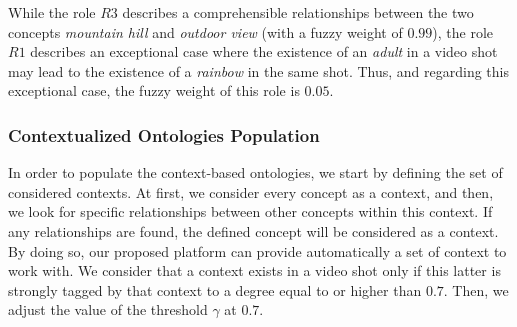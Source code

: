 		
		While the role $R3$ describes a comprehensible relationships
		between the two concepts \emph{mountain hill} and \emph{outdoor view} (with a fuzzy weight of $0.99$), the role $R1$ 
		describes an exceptional case where the existence of an \emph{adult} in a video shot may 
		lead to the existence of a
		\emph{rainbow} in the same shot. Thus, and regarding this exceptional case, the fuzzy weight of 
		this role is $0.05$.


			\subsubsection{Contextualized Ontologies Population}
		In order to populate the context-based ontologies, we start by defining the set of considered contexts. 
		At first, we consider every concept as a context, and then, we look for specific relationships between other 
		concepts within this context. If any relationships are found, the defined concept will be considered
		as a context. 
		By doing so, our proposed platform can provide automatically a set of context to work with. We consider 
		that a context exists in a video shot only if this latter is strongly tagged by that context to a degree equal 
		to or higher than $0.7$. Then, we adjust the value of the threshold $\gamma$ at $0.7$.

